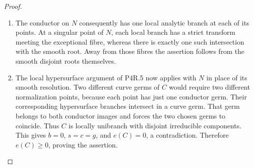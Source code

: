 \begin{proof}
\begin{enumerate}[label={$\langle1\rangle$\arabic*.},leftmargin=*]
\item The conductor on $N$ consequently has
one local analytic branch at each of
its points. At a singular point of $N$,
each local branch has a strict transform
meeting the exceptional fibre, whereas
there is exactly one such intersection
with the smooth root. Away from those
fibres the assertion follows from the
smooth disjoint roots themselves.

\item The local hypersurface argument of
P4R.5 now applies with $N$ in place of
its smooth resolution. Two different
curve germs of $C$ would require two
different normalization points, because
each point has just one conductor germ.
Their corresponding hypersurface
branches intersect in a curve germ.
That germ belongs to both conductor
images and forces the two chosen germs
to coincide. Thus $C$ is locally
unibranch with disjoint irreducible
components. This gives $b=0$, $s=c=g$,
and $e(C)=0$, a contradiction.
Therefore $e(C)\ge0$, proving the
assertion.

\end{enumerate}
\end{proof}
